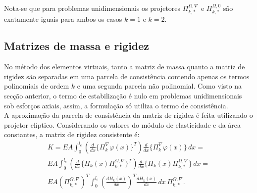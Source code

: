 \indent Nota-se que para problemas unidimensionais os projetores $\Pi_{k,*}^{\Omega,\nabla}$ e $\Pi_{k,*}^{\Omega,0}$ são exatamente iguais para ambos os casos $k=1$ e $k=2$.

\subsection{Matrizes de massa e rigidez}

\indent No método dos elementos virtuais, tanto a matriz de massa quanto a matriz de rigidez são separadas em uma parcela de consistência contendo apenas os termos polinomiais de ordem $k$ e uma segunda parcela não polinomial. Como visto na secção anterior, o termo de estabilização é nulo em problemas unidimensionais sob esforços axiais, assim, a formulação só utiliza o termo de consistência. \\
\indent A aproximação da parcela de consistência da matriz de rigidez é feita utilizando o projetor elíptico. Considerando os valores do módulo de elasticidade e da área constantes, a matriz de rigidez consistente é:
\begin{equation}
    \begin{split}
        K = EA \int_{0}^{l_e} \left(\frac{d}{dx}\{\Pi_{k}^{\nabla} \varphi(x)\}^T\right) \frac{d}{dx}\{\Pi_{k}^{\nabla} \varphi(x)\} \, dx = \\
        EA \int_{0}^{l_e} \left(\frac{d}{dx}\{H_k(x) \Pi_{k,*}^{\Omega,\nabla} \}^T\right) \frac{d}{dx}\{H_k(x) \Pi_{k,*}^{\Omega,\nabla}\} \, dx = \\
        EA \left(\Pi_{k,*}^{\Omega,\nabla}\right)^T \int_{0}^{l_e} \left(\frac{d H_k(x)}{dx}\right)^T \frac{d H_k(x)}{dx} \, dx \, \Pi_{k,*}^{\Omega,\nabla}.
    \end{split}
\end{equation}


